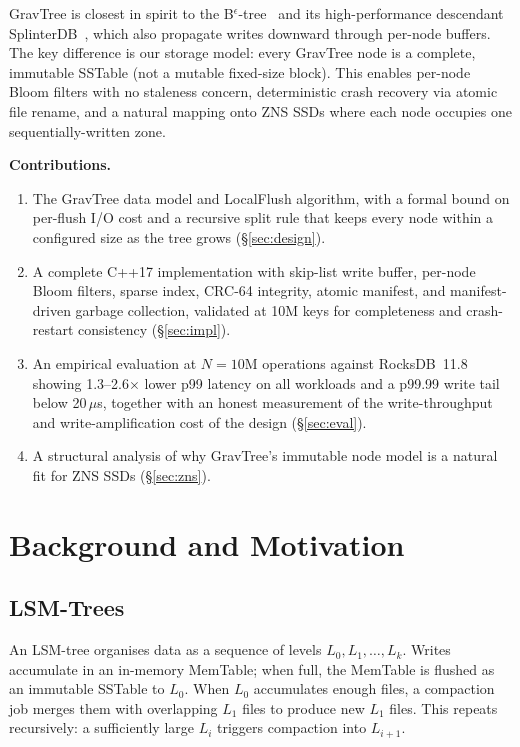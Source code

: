 \documentclass[10pt,twocolumn]{article}
\begin{document}
GravTree is closest in spirit to the B$^\epsilon$-tree~\cite{bender2007cache}
and its high-performance descendant SplinterDB~\cite{splinterdb}, which also
propagate writes downward through per-node buffers.  The key difference is our
storage model: every GravTree node is a complete, immutable SSTable (not a
mutable fixed-size block).  This enables per-node Bloom filters with no
staleness concern, deterministic crash recovery via atomic file rename, and a
natural mapping onto ZNS SSDs where each node occupies one sequentially-written
zone.

\textbf{Contributions.}
\begin{enumerate}
  \item The GravTree data model and LocalFlush algorithm, with a formal bound
        on per-flush I/O cost and a recursive split rule that keeps every node
        within a configured size as the tree grows (\S\ref{sec:design}).
  \item A complete C++17 implementation with skip-list write buffer, per-node
        Bloom filters, sparse index, CRC-64 integrity, atomic manifest, and
        manifest-driven garbage collection, validated at 10M keys for
        completeness and crash-restart consistency (\S\ref{sec:impl}).
  \item An empirical evaluation at $N = 10$M operations against RocksDB~11.8
        showing 1.3--2.6$\times$ lower p99 latency on all workloads and a
        p99.99 write tail below 20\,$\mu$s, together with an honest
        measurement of the write-throughput and write-amplification cost of
        the design (\S\ref{sec:eval}).
  \item A structural analysis of why GravTree's immutable node model is a
        natural fit for ZNS SSDs (\S\ref{sec:zns}).
\end{enumerate}

\section{Background and Motivation}
\label{sec:background}

\subsection{LSM-Trees}

An LSM-tree organises data as a sequence of levels $L_0, L_1, \ldots, L_k$.
Writes accumulate in an in-memory MemTable; when full, the MemTable is flushed
as an immutable SSTable to $L_0$.  When $L_0$ accumulates enough files, a
compaction job merges them with overlapping $L_1$ files to produce new $L_1$
files.  This repeats recursively: a sufficiently large $L_i$ triggers
compaction into $L_{i+1}$.
\end{document}
